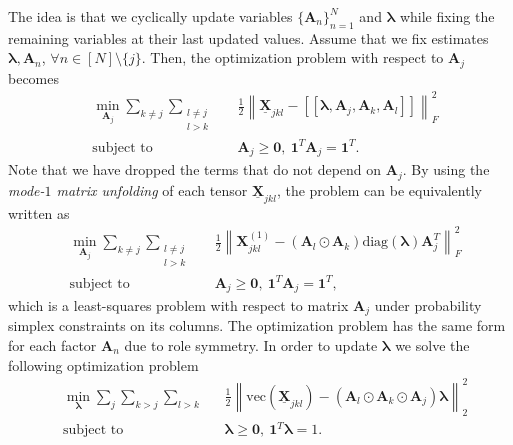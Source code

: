 \documentclass[journal]{IEEEtran}
\begin{document}
The idea is that we cyclically update variables $\{\mathbf{A}_n\}_{n=1}^N$ and $\boldsymbol{\lambda}$ while fixing the remaining variables at their last updated values. Assume that we fix estimates $\boldsymbol{\lambda},\mathbf{A}_n$, $ \forall n \in [N] \setminus \{j\}$. Then, the optimization problem with respect to $\mathbf{A}_j$ becomes
\begin{equation}
\begin{aligned}
&  \min_{ \mathbf{A}_j} \sum_{k \neq j} \sum_{\substack{l\neq j \\ l > k}} && \frac{1}{2} \left \| \underline{\mathbf{X}}_{jkl} - [\![ \boldsymbol{\lambda},\mathbf{A}_j,\mathbf{A}_k,\mathbf{A}_l ]\!] \right \|_F^2 \\
& \text{subject to} & & \mathbf{A}_j \geq \mathbf{0},~{\mathbf{1}}^T \mathbf{A}_j = \mathbf{1}^T.   
\end{aligned}
\end{equation}
Note that we have dropped the terms that do not depend on $\mathbf{A}_j$. By using the \emph{mode-$1$ matrix unfolding} of each tensor $\underline{\mathbf{X}}_{jkl}$, the problem can be equivalently written as
\begin{equation}
\begin{aligned}
&  \min_{ \mathbf{A}_j} \sum_{k \neq j} \sum_{\substack{l\neq j \\ l > k}}  && \frac{1}{2} \left \| \mathbf{X}_{jkl}^{(1)} - (\mathbf{A}_l \odot \mathbf{A}_k) \textrm{diag}(\boldsymbol{\lambda}) \mathbf{A}_j^T \right \|_F^2 \\
& \text{subject to} & & \mathbf{A}_j \geq \mathbf{0}, ~ {\mathbf{1}}^T \mathbf{A}_j = \mathbf{1}^T, 
\end{aligned}
\label{opt:coupled_tensor_sub1}
\end{equation}
which is a least-squares problem with respect to matrix $\mathbf{A}_j$ under probability simplex constraints on its columns. The optimization problem has the same form for each factor $\mathbf{A}_n$ due to role symmetry. In order to update $\boldsymbol{\lambda}$ we solve the following optimization problem
\begin{equation}
\begin{aligned}
&  \min_{ \boldsymbol{\lambda} } \sum_{j} \sum_{k>j} \sum_{l>k}  && \frac{1}{2} \left \| \text{vec}(\underline{\mathbf{X}}_{jkl}) - (\mathbf{A}_l \odot \mathbf{A}_k \odot \mathbf{A}_j) \boldsymbol{\lambda}  \right \|_2^2 \\
& \text{subject to} & & \boldsymbol{\lambda} \geq \mathbf{0},~ {\mathbf{1}}^T \boldsymbol{\lambda} = 1.  \\
\end{aligned}
\label{opt:coupled_tensor_sub2}
\end{equation}
\end{document}
